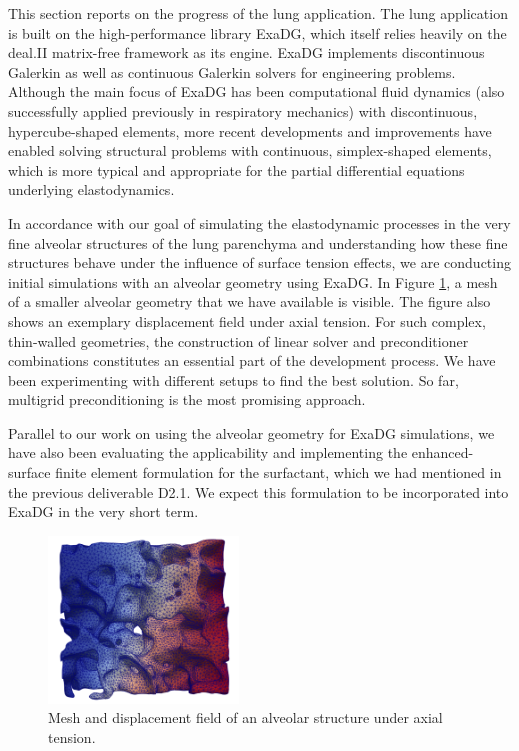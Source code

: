 \documentclass[a4paper,12pt]{article}
\begin{document}
This section reports on the progress of the lung application. The lung application is built on the high-performance library ExaDG, which itself relies heavily on the deal.II matrix-free framework as its engine. ExaDG implements discontinuous Galerkin as well as continuous Galerkin solvers for engineering problems. Although the main focus of ExaDG has been computational fluid dynamics (also successfully applied previously in respiratory mechanics) with discontinuous, hypercube-shaped elements, more recent developments and improvements \cite{schussnig2025matrixfree} have enabled solving structural problems with continuous, simplex-shaped elements, which is more typical and appropriate for the partial differential equations underlying elastodynamics.

In accordance with our goal of simulating the elastodynamic processes in the very fine alveolar structures of the lung parenchyma and understanding how these fine structures behave under the influence of surface tension effects, we are conducting initial simulations with an alveolar geometry using ExaDG. In Figure \ref{fig:alveolar-structure}, a mesh of a smaller alveolar geometry that we have available is visible. The figure also shows an exemplary displacement field under axial tension. For such complex, thin-walled geometries, the construction of linear solver and preconditioner combinations constitutes an essential part of the development process. We have been experimenting with different setups to find the best solution. So far, multigrid preconditioning is the most promising approach.

Parallel to our work on using the alveolar geometry for ExaDG simulations, we have also been evaluating the applicability and implementing the enhanced-surface finite element formulation for the surfactant, which we had mentioned in the previous deliverable D2.1. We expect this formulation to be incorporated into ExaDG in the very short term.

\begin{figure}
  \centering

  \includegraphics[width=0.45\textwidth]{tum-alveolar-structure.png}

  \caption{Mesh and displacement field of an alveolar structure under axial tension.}
  \label{fig:alveolar-structure}
\end{figure}
\end{document}

